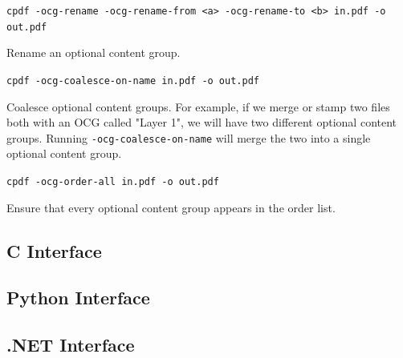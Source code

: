 \documentclass{book}
\begin{document}
  {\small\begin{framed}
  \noindent\verb!cpdf -ocg-rename -ocg-rename-from <a> -ocg-rename-to <b> in.pdf -o out.pdf!
  \end{framed}}

\noindent Rename an optional content group.

  {\small\begin{framed}
  \noindent\verb!cpdf -ocg-coalesce-on-name in.pdf -o out.pdf!
  \end{framed}}


\noindent Coalesce optional content groups. For example, if we merge or stamp two files both with an OCG called "Layer 1", we will have two different optional content groups. Running \texttt{-ocg-coalesce-on-name} will merge the two into a single optional content group.

  {\small\begin{framed}
  \noindent\verb!cpdf -ocg-order-all in.pdf -o out.pdf!
  \end{framed}}

\noindent Ensure that every optional content group appears in the order list.

\begin{cpdflib}
\clearpage
\section*{C Interface}
\begin{small}\tt

\end{small}
\end{cpdflib}

\begin{pycpdflib}
\clearpage
\section*{Python Interface}
\begin{small}\tt

\end{small}
\end{pycpdflib}

\begin{dotnetcpdflib}
\clearpage
\section*{.NET Interface}
\begin{small}\tt

\end{small}
\end{dotnetcpdflib}
\end{document}
